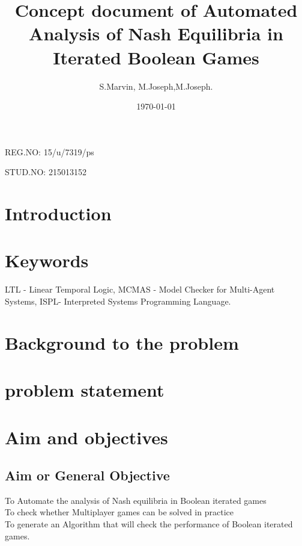 \documentclass[14pt, a4paper]{article}
\begin{document}
		\begin{flushleft} \begin{huge} REG.NO: 15/u/7319/ps  \end{huge} \end{flushleft}

		\begin{flushleft} \begin{huge} STUD.NO: 215013152   \end{huge} \end{flushleft}

		
		
		
		\title{Concept document of Automated Analysis of Nash Equilibria in Iterated Boolean Games }

		\author{S.Marvin, M.Joseph,M.Joseph.}

		\date {\today}

		\maketitle

		\tableofcontents

			\section{Introduction}

				

			\section{Keywords}
			
				LTL - Linear Temporal Logic, MCMAS - Model Checker for Multi-Agent Systems, ISPL- Interpreted Systems Programming Language.

				

			\section{Background to the problem}

				
			\section{problem statement}
			
			
			\section{Aim and objectives}
			
				\subsection{Aim or General Objective}
					To Automate the analysis of Nash equilibria in Boolean iterated games\\
		To check whether Multiplayer games can be solved in practice\\
		To generate an Algorithm that will check the performance of Boolean iterated games.\\
		
\end{document}
